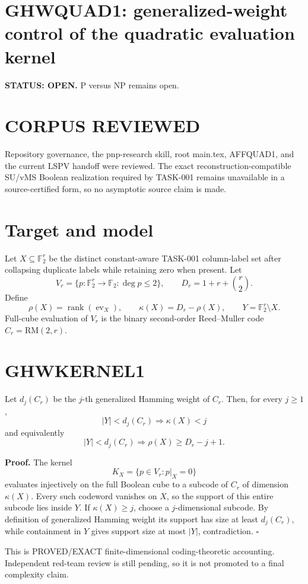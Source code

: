 \documentclass{article}
\begin{document}
\section*{GHWQUAD1: generalized-weight control of the quadratic evaluation kernel}
\textbf{STATUS: OPEN.} P versus NP remains open.

\section*{CORPUS REVIEWED}
Repository governance, the pnp-research skill, root main.tex, AFFQUAD1, and the current LSPV handoff were reviewed. The exact reconstruction-compatible SU/vMS Boolean realization required by TASK-001 remains unavailable in a source-certified form, so no asymptotic source claim is made.

\section*{Target and model}
Let \(X\subseteq\mathbb F_2^r\) be the distinct constant-aware TASK-001 column-label set after collapsing duplicate labels while retaining zero when present. Let
\[
V_r=\{p:\mathbb F_2^r\to\mathbb F_2:\deg p\le2\},
\qquad
D_r=1+r+\binom r2.
\]
Define
\[
\rho(X)=\operatorname{rank}(\operatorname{ev}_X),
\qquad
\kappa(X)=D_r-\rho(X),
\qquad
Y=\mathbb F_2^r\setminus X.
\]
Full-cube evaluation of \(V_r\) is the binary second-order Reed--Muller code \(C_r=\mathrm{RM}(2,r)\).

\section*{GHWKERNEL1}
Let \(d_j(C_r)\) be the \(j\)-th generalized Hamming weight of \(C_r\). Then, for every \(j\ge1\),
\[
\boxed{|Y|<d_j(C_r)\Longrightarrow\kappa(X)<j}
\]
and equivalently
\[
\boxed{|Y|<d_j(C_r)\Longrightarrow\rho(X)\ge D_r-j+1.}
\]

\textbf{Proof.}
The kernel
\[
K_X=\{p\in V_r:p|_X=0\}
\]
evaluates injectively on the full Boolean cube to a subcode of \(C_r\) of dimension \(\kappa(X)\). Every such codeword vanishes on \(X\), so the support of this entire subcode lies inside \(Y\). If \(\kappa(X)\ge j\), choose a \(j\)-dimensional subcode. By definition of generalized Hamming weight its support has size at least \(d_j(C_r)\), while containment in \(Y\) gives support size at most \(|Y|\), contradiction. \(\square\)

This is PROVED/EXACT finite-dimensional coding-theoretic accounting. Independent red-team review is still pending, so it is not promoted to a final complexity claim.
\end{document}
